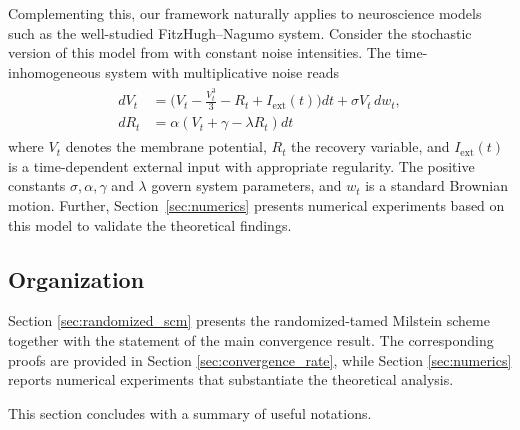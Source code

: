 \documentclass[reqno,  oneside, 12pt]{amsart}
\begin{document}
Complementing this, our framework naturally applies to neuroscience models such as the well-studied FitzHugh--Nagumo system.
Consider the stochastic version of this model from \cite{Baladron2012, Tuckwell2003} with constant noise intensities. The time-inhomogeneous system with multiplicative noise reads
\begin{align}
	\label{eq:sde-system}
	\begin{aligned}
		dV_t &= \bigl( V_t - \tfrac{V_t^3}{3} - R_t + I_{\mathrm{ext}}(t) \bigr) dt + \sigma V_t \, dw_t, \\[0.8ex]
		dR_t &= \alpha ( V_t + \gamma - \lambda R_t ) dt
	\end{aligned}
\end{align}
where \(V_t\) denotes the membrane potential, \(R_t\) the recovery variable, and \(I_{\mathrm{ext}}(t)\) is a time-dependent external input with appropriate regularity. The positive constants \(\sigma, \alpha, \gamma\) and \( \lambda\) govern system parameters, and \(w_t\) is a  standard Brownian motion.
Further, Section~\ref{sec:numerics} presents numerical experiments based on this model to validate the theoretical findings. 

\subsection*{Organization}  Section \ref{sec:randomized_scm} presents the randomized-tamed Milstein scheme together with the statement of the main convergence result. The corresponding proofs are provided in Section \ref{sec:convergence_rate}, while Section \ref{sec:numerics} reports numerical experiments that substantiate the theoretical analysis.

This section concludes with a summary of useful notations.
\end{document}
